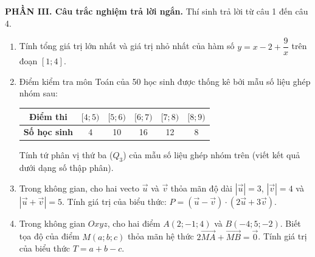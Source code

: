 \documentclass[12pt]{article}
\begin{document}
	\vspace{4mm}
	\noindent\textbf{PHẦN III. Câu trắc nghiệm trả lời ngắn.} Thí sinh trả lời từ câu 1 đến câu 4.
	\vspace{2mm}
	
	\begin{enumerate}[label=\textbf{Câu \arabic*.}, leftmargin=*]
		
		\item Tính tổng giá trị lớn nhất và giá trị nhỏ nhất của hàm số $y = x - 2 + \dfrac{9}{x}$ trên đoạn $[1; 4]$.
		
		\vspace{2mm}
		\item Điểm kiểm tra môn Toán của 50 học sinh được thống kê bởi mẫu số liệu ghép nhóm sau:
		\begin{center}
			\renewcommand{\arraystretch}{1.2}
			\begin{tabular}{|c|c|c|c|c|c|}
				\hline
				\textbf{Điểm thi} & $[4; 5)$ & $[5; 6)$ & $[6; 7)$ & $[7; 8)$ & $[8; 9)$ \\
				\hline
				\textbf{Số học sinh} & 4 & 10 & 16 & 12 & 8 \\
				\hline
			\end{tabular}
		\end{center}
		Tính tứ phân vị thứ ba ($Q_3$) của mẫu số liệu ghép nhóm trên (viết kết quả dưới dạng số thập phân).
		
		\vspace{2mm}
		\item Trong không gian, cho hai vecto $\vec{u}$ và $\vec{v}$ thỏa mãn độ dài $|\vec{u}| = 3$, $|\vec{v}| = 4$ và $|\vec{u} + \vec{v}| = 5$. Tính giá trị của biểu thức: $P = (\vec{u} - \vec{v}) \cdot (2\vec{u} + 3\vec{v})$.
		
		\vspace{2mm}
		\item Trong không gian $Oxyz$, cho hai điểm $A(2; -1; 4)$ và $B(-4; 5; -2)$. Biết tọa độ của điểm $M(a; b; c)$ thỏa mãn hệ thức $2\overrightarrow{MA} + \overrightarrow{MB} = \vec{0}$. Tính giá trị của biểu thức $T = a + b - c$.
		
	\end{enumerate}
	
\end{document}
